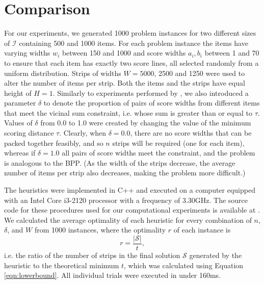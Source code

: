 \documentclass[oribibl]{llncs}
\begin{document}
\section{Comparison}
For our experiments, we generated 1000 problem instances for two different sizes of $\mathcal{I}$ containing 500 and 1000 items. For each problem instance the items have varying widths $w_i$ between 150 and 1000 and score widths $a_i, b_i$ between 1 and 70 to ensure that each item has exactly two score lines, all selected randomly from a uniform distribution. Strips of widths $W = 5000$, 2500 and 1250 were used to alter the number of items per strip. Both the items and the strips have equal height of $H = 1$. Similarly to experiments performed by \cite{lewis2011}, we also introduced a parameter $\delta$ to denote the proportion of pairs of score widths from different items that meet the vicinal sum constraint, i.e. whose sum is greater than or equal to $\tau$. Values of $\delta$ from 0.0 to 1.0 were created by changing the value of the minimum scoring distance $\tau$. Clearly, when $\delta = 0.0$, there are no score widths that can be packed together feasibly, and so $n$ strips will be required (one for each item), whereas if $\delta = 1.0$ all pairs of score widths meet the constraint, and the problem is analogous to the BPP. (As the width of the strips decrease, the average number of items per strip also decreases, making the problem more difficult.)

The heuristics were implemented in C++ and executed on a computer equipped with an Intel Core i3-2120 processor with a frequency of 3.30GHz. The source code for these procedures used for our computational experiments is available at \cite{hawa2018}. We calculated the average optimality of each heuristic for every combination of $n$, $\delta$, and $W$ from 1000 instances, where the optimality $r$ of each instance is
\begin{equation}
	r = \frac{|\mathcal{S}|}{t},
\end{equation}
i.e. the ratio of the number of strips in the final solution $\mathcal{S}$ generated by the heuristic to the theoretical minimum $t$, which was calculated using Equation \ref{eqn:lowerbound}. All individual trials were executed in under 160ms.
\end{document}
